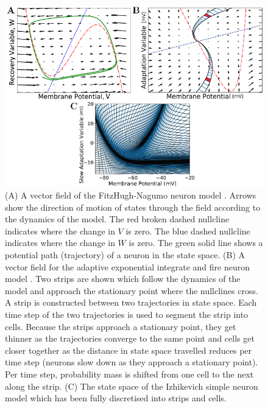 \documentclass[utf8]{frontiersSCNS} %
\begin{document}
\begin{figure}[tb!]
  \centering
    \includegraphics[width=\linewidth, valign=t]{images/vector_field_full_figure.pdf}
  \caption{(A) A vector field of the FitzHugh-Nagumo neuron model \citep{fitzhugh1961impulses}. Arrows show the direction of motion of states through the field according to the dynamics of the model. The red broken dashed nullcline indicates where the change in $V$ is zero. The blue dashed nullcline indicates where the change in $W$ is zero. The green solid line shows a potential path (trajectory) of a neuron in the state space. (B) A vector field for the adaptive exponential integrate and fire neuron model \citep{brette2005}. Two strips are shown which follow the dynamics of the model and approach the stationary point where the nullclines cross. A strip is constructed between two trajectories in state space. Each time step of the two trajectories is used to segment the strip into cells. Because the strips approach a stationary point, they get thinner as the trajectories converge to the same point and cells get closer together as the distance in state space travelled reduces per time step (neurons slow down as they approach a stationary point). Per time step, probability mass is shifted from one cell to the next along the strip. (C) The state space of the Izhikevich simple neuron model \citep{izhikevich2003simple} which has been fully discretised into strips and cells.}
  \label{fig:strip}
\end{figure}
\end{document}
